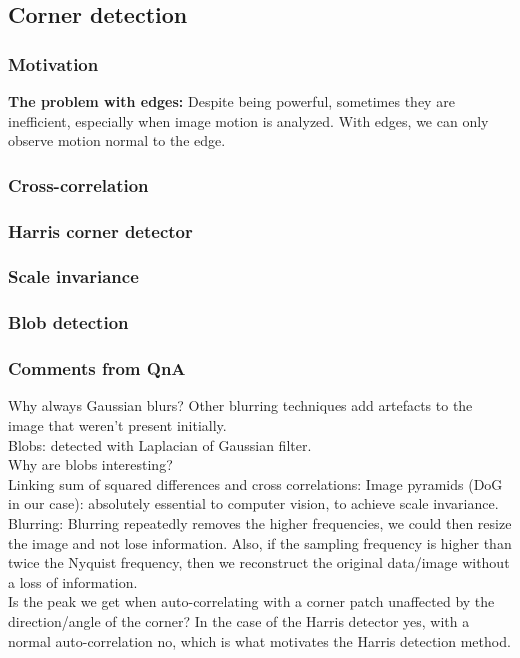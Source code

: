 \documentclass[a4paper,11pt]{article}
\begin{document}
\subsection{Corner detection}
\subsubsection{Motivation}
\textbf{The problem with edges:} Despite being powerful, sometimes they are inefficient, especially when image motion is analyzed. With edges, we can only observe motion normal to the edge.
\subsubsection{Cross-correlation}
\subsubsection{Harris corner detector}
\subsubsection{Scale invariance}
\subsubsection{Blob detection}
\subsubsection{Comments from QnA}
Why always Gaussian blurs? Other blurring techniques add artefacts to the image that weren't present initially.\\
Blobs: detected with Laplacian of Gaussian filter.\\
Why are blobs interesting?\\
Linking sum of squared differences and cross correlations: 
Image pyramids (DoG in our case): absolutely essential to computer vision, to achieve scale invariance.\\
Blurring: Blurring repeatedly removes the higher frequencies, we could then resize the image and not lose information. Also, if the sampling frequency is higher than twice the Nyquist frequency, then we reconstruct the original data/image without a loss of information.\\
Is the peak we get when auto-correlating with a corner patch unaffected by the direction/angle of the corner? In the case of the Harris detector yes, with a normal auto-correlation no, which is what motivates the Harris detection method.\\
\end{document}
